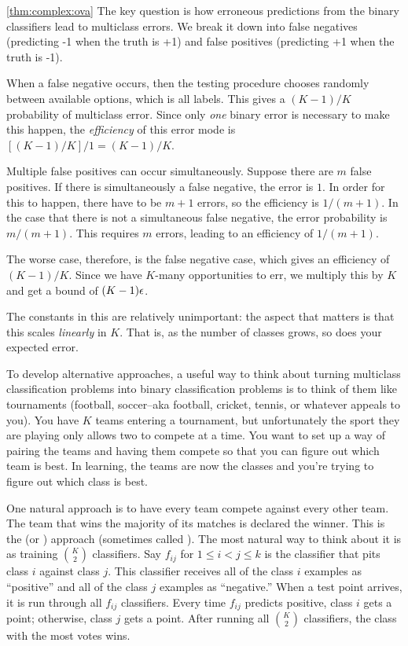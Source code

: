 \begin{myproof}{\ref{thm:complex:ova}}
  The key question is how erroneous predictions from the binary
  classifiers lead to multiclass errors.  We break it down into false
  negatives (predicting -1 when the truth is +1) and false positives
  (predicting +1 when the truth is -1).

  When a false negative occurs, then the testing procedure chooses
  randomly between available options, which is all labels.  This gives
  a $(K-1)/K$ probability of multiclass error.  Since only \emph{one}
  binary error is necessary to make this happen, the \emph{efficiency}
  of this error mode is $[ (K-1) / K ] / 1 = (K-1) / K$.

  Multiple false positives can occur simultaneously.  Suppose there
  are $m$ false positives.  If there is simultaneously a false
  negative, the error is $1$.  In order for this to happen, there have
  to be $m+1$ errors, so the efficiency is $1/(m+1)$.  In the case
  that there is not a simultaneous false negative, the error
  probability is $m/(m+1)$.  This requires $m$ errors, leading to an
  efficiency of $1/(m+1)$.

  The worse case, therefore, is the false negative case, which gives
  an efficiency of $(K-1)/K$.  Since we have $K$-many opportunities to
  err, we multiply this by $K$ and get a bound of $(K-1) \epsilon$.
\end{myproof}

The constants in this are relatively unimportant: the aspect that
matters is that this scales \emph{linearly} in $K$.  That is, as the
number of classes grows, so does your expected error.

To develop alternative approaches, a useful way to think about turning
multiclass classification problems into binary classification problems
is to think of them like tournaments (football, soccer--aka football,
cricket, tennis, or whatever appeals to you).  You have $K$ teams
entering a tournament, but unfortunately the sport they are playing
only allows two to compete at a time.  You want to set up a way of
pairing the teams and having them compete so that you can figure out
which team is best.  In learning, the teams are now the classes and
you're trying to figure out which class is best.

One natural approach is to have every team compete against every other
team.  The team that wins the majority of its matches is declared the
winner.  This is the  (or )
approach (sometimes called ).  The most natural way
to think about it is as training $K \choose 2$ classifiers.  Say
$f_{ij}$ for $1 \leq i < j \leq k$ is the classifier that pits class
$i$ against class $j$.  This classifier receives all of the class $i$
examples as ``positive'' and all of the class $j$ examples as
``negative.''  When a test point arrives, it is run through all
$f_{ij}$ classifiers.  Every time $f_{ij}$ predicts positive, class
$i$ gets a point; otherwise, class $j$ gets a point.  After running
all $K \choose 2$ classifiers, the class with the most votes wins.

